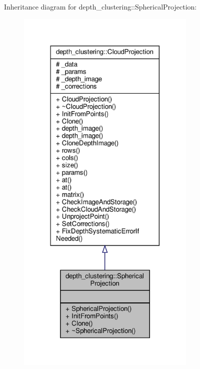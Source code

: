 Inheritance diagram for depth\+\_\+clustering\+:\+:Spherical\+Projection\+:\nopagebreak
\begin{figure}[H]
\begin{center}
\leavevmode
\includegraphics[width=243pt]{classdepth__clustering_1_1SphericalProjection__inherit__graph}
\end{center}
\end{figure}


